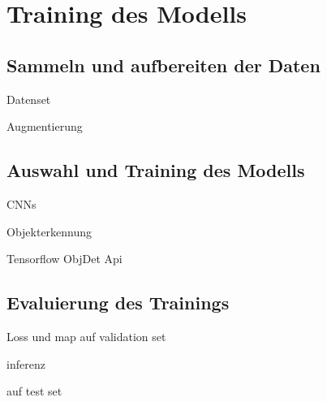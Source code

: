 \section[\thesection \  Training des Modells]{Training des Modells}\label{sec:training}
%
%
\subsection[\thesection .\thesubsection \ 
Sammeln und aufbereiten der Daten]{Sammeln und aufbereiten der Daten}\label{subsec:collect_data}
%
\begin{frame}{Datenset}

\end{frame}

\begin{frame}{Augmentierung}
    
\end{frame}

\subsection[\thesection .\thesubsection \ 
Auswahl und Training des Modells]{Auswahl und Training des Modells}\label{subsec:train_model}

\begin{frame}{CNNs}

\end{frame}

\begin{frame}{Objekterkennung}
    
\end{frame}

\begin{frame}{Tensorflow ObjDet Api}
    
\end{frame}

\subsection[\thesection .\thesubsection \ 
Evaluierung des Trainings]{Evaluierung des Trainings}\label{subsec:eval}

\begin{frame}{Loss und map}
    auf validation set

\end{frame}

\begin{frame}{inferenz}

    auf test set
    
\end{frame}
